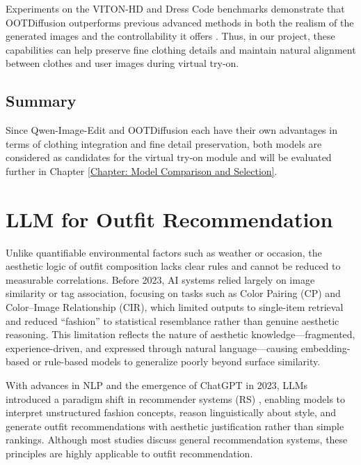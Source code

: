 Experiments on the VITON-HD and Dress Code benchmarks demonstrate that OOTDiffusion outperforms previous advanced methods in both the realism of the generated images and the controllability it offers \citep{xu2025ootddiffusion}. Thus, in our project, these capabilities can help preserve fine clothing details and maintain natural alignment between clothes and user images during virtual try-on.


\subsection{Summary}

 Since Qwen-Image-Edit and OOTDiffusion each have their own advantages in terms of clothing integration and fine detail preservation, both models are considered as candidates for the virtual try-on module and will be evaluated further in Chapter \ref{Chapter: Model Comparison and Selection}. 





\section{LLM for Outfit Recommendation}
Unlike quantifiable environmental factors such as weather or occasion, the aesthetic logic of outfit composition lacks clear rules and cannot be reduced to measurable correlations. Before 2023, AI systems relied largely on image similarity or tag association, focusing on tasks such as Color Pairing (CP) and Color–Image Relationship (CIR), which limited outputs to single-item retrieval and reduced “fashion” to statistical resemblance rather than genuine aesthetic reasoning. This limitation reflects the nature of aesthetic knowledge—fragmented, experience-driven, and expressed through natural language—causing embedding-based or rule-based models to generalize poorly beyond surface similarity.

With advances in NLP and the emergence of ChatGPT in 2023, LLMs introduced a paradigm shift in recommender systems (RS) \citep{wu2023survey, lin2023benefit}, enabling models to interpret unstructured fashion concepts, reason linguistically about style, and generate outfit recommendations with aesthetic justification rather than simple rankings. Although most studies discuss general recommendation systems, these principles are highly applicable to outfit recommendation.


